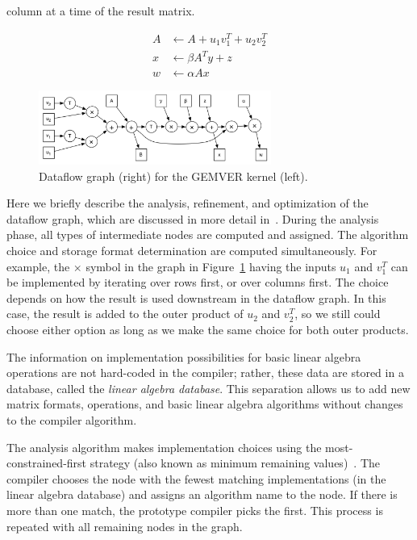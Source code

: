 \documentclass[runningheads]{llncs}
\begin{document}
column at a time of the result matrix.
\begin{figure}[ht]
\begin{minipage}{.3\textwidth}
\begin{align*}
  A &\gets A + u_1 v_1^T + u_2 v_2^T \\[-0.5ex]
  x &\gets \beta A^T y + z \\[-0.5ex]
  w &\gets \alpha A x
\end{align*} 
\end{minipage}
\begin{minipage}{.6\textwidth}
\includegraphics[width=3in]{figures/gemver-dataflow.png}
\end{minipage}
\caption{Dataflow graph (right) for the GEMVER kernel (left).}
\label{fig:gemver-dataflow}
\end{figure}

Here we briefly describe the analysis, refinement, and optimization of the
dataflow graph, which are discussed in more detail in~\cite{Siek}. During the
analysis phase, all types of intermediate nodes are computed and
assigned. The algorithm choice and storage format determination are computed
simultaneously. For example, the $\times$ symbol in the graph in
Figure~\ref{fig:gemver-dataflow} having the inputs $u_1$ and $v_1^T$ can be
implemented by iterating over rows first, or over columns first. The choice
depends on how the result is used downstream in the dataflow graph.  In this
case, the result is added to the outer product of $u_2$ and $v_2^T$, so we
still could choose either option as long as we make the same choice for both
outer products. 

The information on implementation possibilities for basic linear algebra
operations are not hard-coded in the compiler; rather, these data are stored
in a database, called the \emph{linear algebra database}.  This separation
allows us to add new matrix formats, operations, and basic linear algebra
algorithms without changes to the compiler algorithm.

The analysis algorithm makes implementation choices using the
most-con\-strained-first strategy (also known as minimum remaining
values)~\cite{Russell:2003mz}.  The compiler chooses the node with the fewest
matching implementations (in the linear algebra database) and assigns an
algorithm name to the node.  If there is more than one match, the prototype
compiler picks the first.  This process is repeated with all remaining nodes
in the graph.
\end{document}
